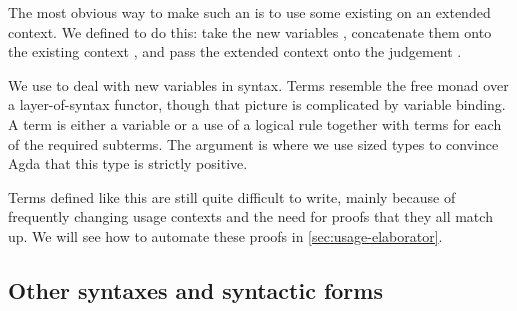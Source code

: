 The most obvious way to make such an  is to use some existing
 on an extended context.
We defined  to do this: take the new variables
\AgdaBound{$\Delta$}, concatenate them onto the existing context
\AgdaBound{$\Gamma$}, and pass the extended context onto the judgement
.



We use  to deal with new variables in syntax.
Terms resemble the free monad over a layer-of-syntax functor, though
that picture is complicated by variable binding.  A term is either a
variable or a use of a logical rule together with terms for each of
the required subterms. The  argument is where we
use sized types to convince Agda that this type is strictly positive.


Terms defined like this are still quite difficult to write, mainly because of
frequently changing usage contexts and the need for proofs that they all match
up.
We will see how to automate these proofs in \cref{sec:usage-elaborator}.







\subsection{Other syntaxes and syntactic forms}\label{sec:other-syntaxes}

